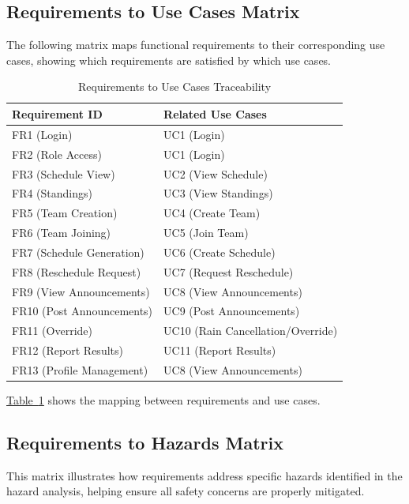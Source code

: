 \documentclass[12pt, titlepage]{article}
\begin{document}
\subsection{Requirements to Use Cases Matrix}
The following matrix maps functional requirements to their corresponding use cases, showing which requirements are satisfied by which use cases.

\begin{table}[H]
\centering
\begin{tabular}{|p{}|p{}|}
\hline
\textbf{Requirement ID} & \textbf{Related Use Cases} \\
\hline
FR1 (Login) & UC1 (Login) \\
\hline
FR2 (Role Access) & UC1 (Login) \\
\hline
FR3 (Schedule View) & UC2 (View Schedule) \\
\hline
FR4 (Standings) & UC3 (View Standings) \\
\hline
FR5 (Team Creation) & UC4 (Create Team) \\
\hline
FR6 (Team Joining) & UC5 (Join Team) \\
\hline
FR7 (Schedule Generation) & UC6 (Create Schedule) \\
\hline
FR8 (Reschedule Request) & UC7 (Request Reschedule) \\
\hline
FR9 (View Announcements) & UC8 (View Announcements) \\
\hline
FR10 (Post Announcements) & UC9 (Post Announcements) \\
\hline
FR11 (Override) & UC10 (Rain Cancellation/Override) \\
\hline
FR12 (Report Results) & UC11 (Report Results) \\
\hline
FR13 (Profile Management) & UC8 (View Announcements) \\
\hline
\end{tabular}
\caption{Requirements to Use Cases Traceability}
\label{tab:req_usecase_matrix}
\end{table}

\hyperref[tab:req_usecase_matrix]{Table~\ref{tab:req_usecase_matrix}} shows the mapping between requirements and use cases.

\subsection{Requirements to Hazards Matrix}
This matrix illustrates how requirements address specific hazards identified in the hazard analysis, helping ensure all safety concerns are properly mitigated.
\end{document}

